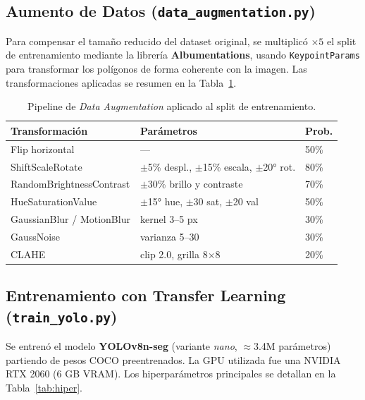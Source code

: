\documentclass[12pt,letterpaper]{article}
\begin{document}
\subsection{Aumento de Datos (\texttt{data\_augmentation.py})}
Para compensar el tamaño reducido del dataset original, se multiplicó $\times 5$ el split de entrenamiento mediante la librería \textbf{Albumentations}, usando \texttt{KeypointParams} para transformar los polígonos de forma coherente con la imagen. Las transformaciones aplicadas se resumen en la Tabla~\ref{tab:augmentation}.

\begin{table}[h!]
\centering
\caption{Pipeline de \textit{Data Augmentation} aplicado al split de entrenamiento.}
\label{tab:augmentation}
\begin{tabular}{@{}lll@{}}
\toprule
\textbf{Transformación} & \textbf{Parámetros} & \textbf{Prob.} \\ \midrule
Flip horizontal         & ---                              & 50\%  \\
ShiftScaleRotate        & $\pm$5\% despl., $\pm$15\% escala, $\pm$20° rot. & 80\%  \\
RandomBrightnessContrast & $\pm$30\% brillo y contraste    & 70\%  \\
HueSaturationValue      & $\pm$15° hue, $\pm$30 sat, $\pm$20 val & 50\%  \\
GaussianBlur / MotionBlur & kernel 3--5 px               & 30\%  \\
GaussNoise              & varianza 5--30                   & 30\%  \\
CLAHE                   & clip 2.0, grilla 8$\times$8      & 20\%  \\ \bottomrule
\end{tabular}
\end{table}

\subsection{Entrenamiento con Transfer Learning (\texttt{train\_yolo.py})}
Se entrenó el modelo \textbf{YOLOv8n-seg} (variante \textit{nano}, $\approx$3.4M parámetros) partiendo de pesos COCO preentrenados. La GPU utilizada fue una NVIDIA RTX 2060 (6 GB VRAM). Los hiperparámetros principales se detallan en la Tabla~\ref{tab:hiper}.
\end{document}
